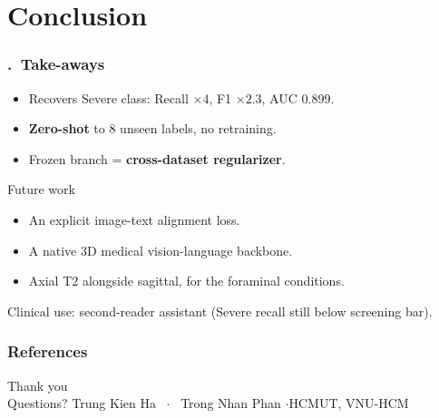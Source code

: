 \documentclass[12pt]{beamer}
\newcommand{\sframetitle}[1]{\frametitle{\thesection.\ #1}}
\begin{document}
\section{Conclusion}
\begin{frame}
\sframetitle{Take-aways}
\begin{itemize}
    \item[\textbf{1.}] Recovers Severe class: Recall $\times 4$, F1 $\times 2.3$, AUC 0.899.
    \item[\textbf{2.}] \textbf{Zero-shot} to 8 unseen labels, no retraining.
    \item[\textbf{3.}] Frozen branch = \textbf{cross-dataset regularizer}.
\end{itemize}
\vspace{6pt}
\begin{block}{Future work}
\begin{itemize}\small
    \item[--] An explicit image-text alignment loss.
    \item[--] A native 3D medical vision-language backbone.
    \item[--] Axial T2 alongside sagittal, for the foraminal conditions.
\end{itemize}
\end{block}
\vspace{4pt}
{\footnotesize Clinical use: second-reader assistant (Severe recall still below screening bar).}
\end{frame}

\begin{frame}[allowframebreaks]
\frametitle{References}
\printbibliography[heading=none]
\end{frame}

\begin{frame}
\centering
\vfill
{\Huge Thank you}\\[14pt]
{\LARGE Questions?}
\vfill
{\footnotesize Trung Kien Ha \, $\cdot$ \, Trong Nhan Phan \quad$\cdot$\quad HCMUT, VNU-HCM}
\vfill
\end{frame}
\end{document}
